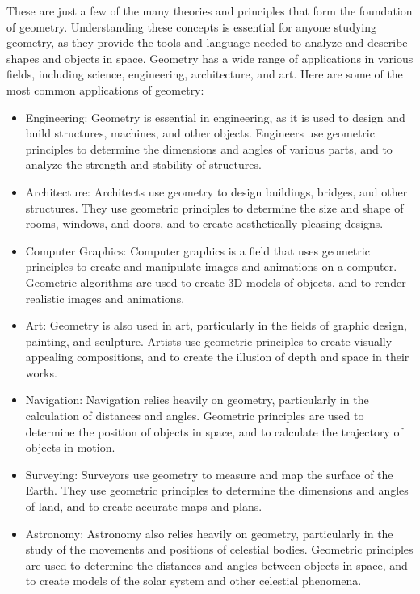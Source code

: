 \noindent These are just a few of the many theories and principles that form the foundation of geometry. Understanding these concepts is essential for anyone studying geometry, as they provide the tools and language needed to analyze and describe shapes and objects in space. Geometry has a wide range of applications in various fields, including science, engineering, architecture, and art. Here are some of the most common applications of geometry:
\begin{itemize}

\item Engineering: Geometry is essential in engineering, as it is used to design and build structures, machines, and other objects. Engineers use geometric principles to determine the dimensions and angles of various parts, and to analyze the strength and stability of structures.

\item Architecture: Architects use geometry to design buildings, bridges, and other structures. They use geometric principles to determine the size and shape of rooms, windows, and doors, and to create aesthetically pleasing designs.

\item Computer Graphics: Computer graphics is a field that uses geometric principles to create and manipulate images and animations on a computer. Geometric algorithms are used to create 3D models of objects, and to render realistic images and animations.

\item Art: Geometry is also used in art, particularly in the fields of graphic design, painting, and sculpture. Artists use geometric principles to create visually appealing compositions, and to create the illusion of depth and space in their works.

\item Navigation: Navigation relies heavily on geometry, particularly in the calculation of distances and angles. Geometric principles are used to determine the position of objects in space, and to calculate the trajectory of objects in motion.

\item Surveying: Surveyors use geometry to measure and map the surface of the Earth. They use geometric principles to determine the dimensions and angles of land, and to create accurate maps and plans.

\item Astronomy: Astronomy also relies heavily on geometry, particularly in the study of the movements and positions of celestial bodies. Geometric principles are used to determine the distances and angles between objects in space, and to create models of the solar system and other celestial phenomena.
\end{itemize}

